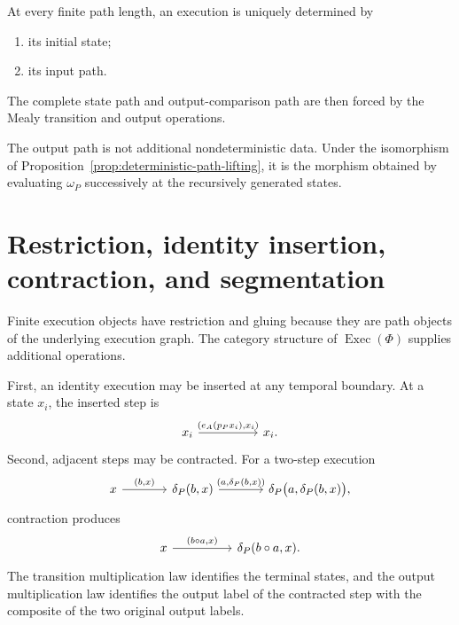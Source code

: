 \begin{corollary}
\label{cor:executions-input-paths-initial-states}
At every finite path length, an execution is uniquely determined by
\begin{enumerate}
    \item its initial state;
    \item its input path.
\end{enumerate}
The complete state path and output-comparison path are then forced by the
Mealy transition and output operations.
\end{corollary}

The output path is not additional nondeterministic data. Under the isomorphism
of Proposition~\ref{prop:deterministic-path-lifting}, it is the morphism
obtained by evaluating \(\omega_P\) successively at the recursively generated
states.

\section{Restriction, identity insertion, contraction, and segmentation}
\label{subsec:execution-identity-contraction}

Finite execution objects have restriction and gluing because they are path
objects of the underlying execution graph. The category structure of
\(\operatorname{Exec}(\Phi)\) supplies additional operations.

First, an identity execution may be inserted at any temporal boundary. At a
state \(x_i\), the inserted step is
\[
\begin{tikzcd}[column sep=huge]
    x_i
        \arrow[r, "{(e_A(p_Px_i),x_i)}"]
    &
    x_i.
\end{tikzcd}
\]
Second, adjacent steps may be contracted. For a two-step execution
\[
\begin{tikzcd}[column sep=large]
    x
        \arrow[r, "{(b,x)}"]
    &
    \delta_P(b,x)
        \arrow[r, "{(a,\delta_P(b,x))}"]
    &
    \delta_P\bigl(a,\delta_P(b,x)\bigr),
\end{tikzcd}
\]
contraction produces
\[
\begin{tikzcd}[column sep=huge]
    x
        \arrow[r, "{(b\circ a,x)}"]
    &
    \delta_P(b\circ a,x).
\end{tikzcd}
\]
The transition multiplication law identifies the terminal states, and the
output multiplication law identifies the output label of the contracted step
with the composite of the two original output labels.


